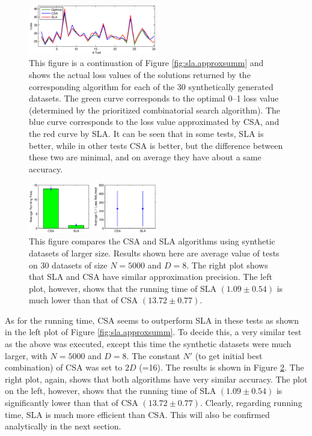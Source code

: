\begin{figure}[here]
\includegraphics[width=0.50\textwidth]{images/fig55_approxlosses.eps}
\caption{
This figure is a continuation of Figure \ref{fig:sla.approxsumm} and shows the actual loss values of the solutions returned by the corresponding algorithm for each of the 30 synthetically generated datasets. The green curve corresponds to the optimal 0--1 loss value (determined by the prioritized combinatorial search algorithm). The blue curve corresponds to the loss value approximated by CSA, and the red curve by SLA. It can be seen that in some tests, SLA is better, while in other tests CSA is better, but the difference between these two are minimal, and on average they have about a same accuracy.
}
\label{fig:sla.approxlosses}
\end{figure}

\begin{figure}[here]
\includegraphics[width=0.50\textwidth]{images/fig56_approxsumm.eps}
\caption{
This figure compares the CSA and SLA algorithms using synthetic datasets of larger size. Results shown here are average value of tests on 30 datasets of size $N=5000$ and $D=8$. The right plot shows that SLA and CSA have similar approximation precision. The left plot, however, shows that the running time of SLA $(1.09 \pm 0.54)$ is much lower than that of CSA $(13.72 \pm 0.77)$.
}
\label{fig:sla.approxsumm2}
\end{figure}

As for the running time, CSA seems to outperform SLA in these tests as shown in the left plot of Figure \ref{fig:sla.approxsumm}. To decide this, a very similar test as the above was executed, except this time the synthetic datasets were much larger, with $N=5000$ and $D=8$. The constant $N'$ (to get initial best combination) of CSA was set to $2D$ (=16). The results is shown in Figure \ref{fig:sla.approxsumm2}. The right plot, again, shows that both algorithms have very similar accuracy. The plot on the left, however, shows that the running time of SLA $(1.09 \pm 0.54)$ is significantly lower than that of CSA $(13.72 \pm 0.77)$. Clearly, regarding running time, SLA is much more efficient than CSA. This will also be confirmed analytically in the next section.




